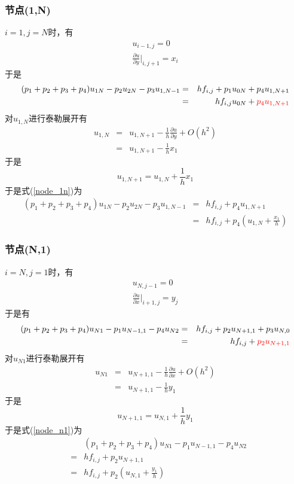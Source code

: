 \documentclass[a4paper,left=2.5cm,right=2.5cm]{article}
\begin{document}
\begin{spacing}{1.6}
	\subsubsection{节点(1,N)}
	$i=1,j=N$时，有
	\begin{eqnarray}
	u_{i-1,j} = 0\\
	\frac{\partial u}{\partial y}\big|_{i,j+1} = x_{i}
	\end{eqnarray}
	于是
	\begin{eqnarray}
	(p_1+p_2+p_3+p_4)u_{1N}-p_2u_{2N} - p_3u_{1,N-1} &=&hf_{i,j}+p_1u_{0N} + p_4u_{1,N+1}\label{node_1n}\\
	&=&hf_{i,j}u_{0N}+{\color{red}p_4u_{1,N+1}}
	\end{eqnarray}
	对$u_{1,N}$进行泰勒展开有
	\begin{eqnarray}
	u_{1,N} &=& u_{1,N+1} - \frac{1}{h}\frac{\partial u}{\partial y} + O(h^2) \\
	&=&u_{1,N+1} - \frac{1}{h}x_1
	\end{eqnarray}
	于是
	\begin{equation}
	u_{1,N+1} = u_{1,N} + \frac{1}{h}x_1
	\end{equation}
	于是式(\ref{node_1n})为
	\begin{eqnarray}
	(p_1+p_2+p_3+p_4)u_{1N}-p_2u_{2N} - p_3u_{1,N-1} &=&hf_{i,j}+ p_4u_{1,N+1}\\
	&=&hf_{i,j}+p_4(u_{1,N}+\frac{x_1}{h})
	\end{eqnarray}
	\subsubsection{节点(N,1)}
	$i=N,j=1$时，有
	\begin{eqnarray}
	u_{N,j-1} = 0\\
	\frac{\partial u}{\partial x} \big|_{i+1,j} = y_j
	\end{eqnarray}
	于是有
	\begin{eqnarray}
	(p_1+p_2+p_3+p_4)u_{N1}-p_1u_{N-1,1} - p_4u_{N2} &=&hf_{i,j}+p_2u_{N+1,1} + p_3u_{N,0}\label{node_n1}\\
	&=&hf_{i,j}+{\color{red}p_2u_{N+1,1}}
	\end{eqnarray}
	对$u_{N1}$进行泰勒展开有
	\begin{eqnarray}
	u_{N1} &=& u_{N+1,1} - \frac{1}{h}\frac{\partial u}{\partial x} + O(h^2) \\
	&=&u_{N+1,1} - \frac{1}{h}y_1
	\end{eqnarray}
	于是
	\begin{equation}
	u_{N+1,1} = u_{N,1} + \frac{1}{h}y_1
	\end{equation}
	于是式(\ref{node_n1})为
	\begin{eqnarray}
	&&(p_1+p_2+p_3+p_4)u_{N1}-p_1u_{N-1,1} - p_4u_{N2}\\ &=&hf_{i,j}+p_2u_{N+1,1} \\
	&=&hf_{i,j}+p_2(u_{N,1}+\frac{y_1}{h})
	\end{eqnarray}

\end{spacing}
\end{document}
